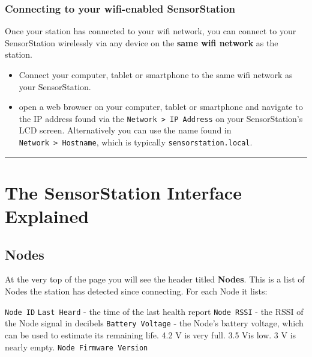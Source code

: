 \documentclass[
]{article}
\providecommand{\tightlist}{%
  \setlength{\itemsep}{0pt}\setlength{\parskip}{0pt}}
\begin{document}
\hypertarget{connecting-to-your-wifi-enabled-sensorstation}{%
\subsubsection{Connecting to your wifi-enabled
SensorStation}\label{connecting-to-your-wifi-enabled-sensorstation}}

Once your station has connected to your wifi network, you can connect to
your SensorStation wirelessly via any device on the \textbf{same wifi
network} as the station.

\begin{itemize}
\tightlist
\item
  Connect your computer, tablet or smartphone to the same wifi network
  as your SensorStation.
\item
  open a web browser on your computer, tablet or smartphone and navigate
  to the IP address found via the
  \texttt{Network\ \textgreater{}\ IP\ Address} on your SensorStation's
  LCD screen. Alternatively you can use the name found in
  \texttt{Network\ \textgreater{}\ Hostname}, which is typically
  \texttt{sensorstation.local}.
\end{itemize}

\begin{center}\rule{0.5\linewidth}{0.5pt}\end{center}

\hypertarget{the-sensorstation-interface-explained}{%
\section{The SensorStation Interface
Explained}\label{the-sensorstation-interface-explained}}

\hypertarget{nodes}{%
\subsection{Nodes}\label{nodes}}

At the very top of the page you will see the header titled
\textbf{Nodes}. This is a list of Nodes the station has detected since
connecting. For each Node it lists:

\texttt{Node\ ID} \texttt{Last\ Heard} - the time of the last health
report \texttt{Node\ RSSI} - the RSSI of the Node signal in decibels
\texttt{Battery\ Voltage} - the Node's battery voltage, which can be
used to estimate its remaining life. 4.2 V is very full. 3.5 Vis low. 3
V is nearly empty. \texttt{Node\ Firmware\ Version}
\end{document}
